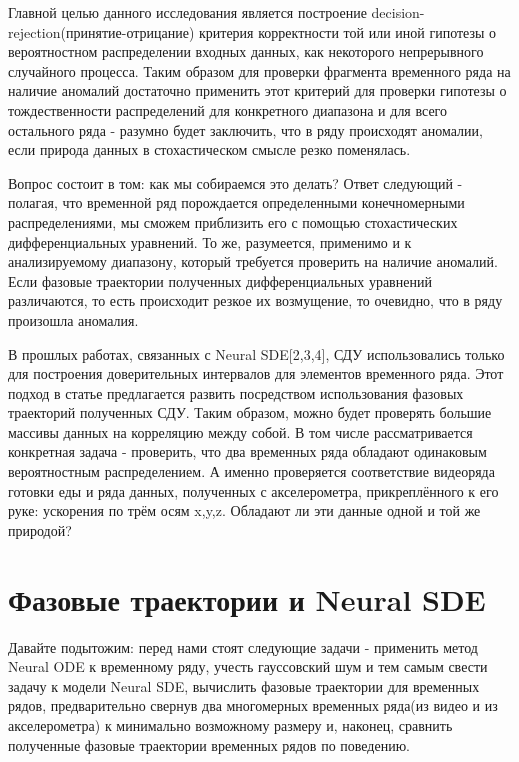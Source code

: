 \documentclass{article}
\begin{document}
   \par Главной целью данного исследования является построение decision-rejection(принятие-отрицание) критерия корректности той или иной гипотезы о вероятностном распределении входных данных, как некоторого непрерывного случайного процесса. Таким образом для проверки фрагмента временного ряда на наличие аномалий достаточно применить этот критерий для проверки гипотезы о тождественности распределений для конкретного диапазона и для всего остального ряда - разумно будет заключить, что в ряду происходят аномалии, если природа данных в стохастическом смысле резко поменялась.
   \par Вопрос состоит в том: как мы собираемся это делать? Ответ следующий - полагая, что временной ряд порождается определенными конечномерными распределениями, мы сможем приблизить его с помощью стохастических дифференциальных уравнений. То же, разумеется, применимо и к анализируемому диапазону, который требуется проверить на наличие аномалий. Если фазовые траектории полученных дифференциальных уравнений различаются, то есть происходит резкое их возмущение, то очевидно, что в ряду произошла аномалия.
   \par В прошлых работах, связанных с Neural SDE[2,3,4], СДУ использовались только для построения доверительных интервалов для элементов временного ряда. Этот подход в статье предлагается развить посредством использования фазовых траекторий полученных СДУ. Таким образом, можно будет проверять большие массивы данных на корреляцию между собой. В том числе рассматривается конкретная задача - проверить, что два временных ряда обладают одинаковым вероятностным распределением. А именно проверяется соответствие видеоряда готовки еды и ряда данных, полученных с акселерометра, прикреплённого к его руке: ускорения по трём осям x,y,z. Обладают ли эти данные одной и той же природой?

\section{Фазовые траектории и Neural SDE}
   \par Давайте подытожим: перед нами стоят следующие задачи - применить метод Neural ODE к временному ряду, учесть гауссовский шум и тем самым свести задачу к модели Neural SDE, вычислить фазовые траектории для временных рядов, предварительно свернув два многомерных временных ряда(из видео и из акселерометра) к минимально возможному размеру и, наконец, сравнить полученные фазовые траектории временных рядов по поведению.
\end{document}
